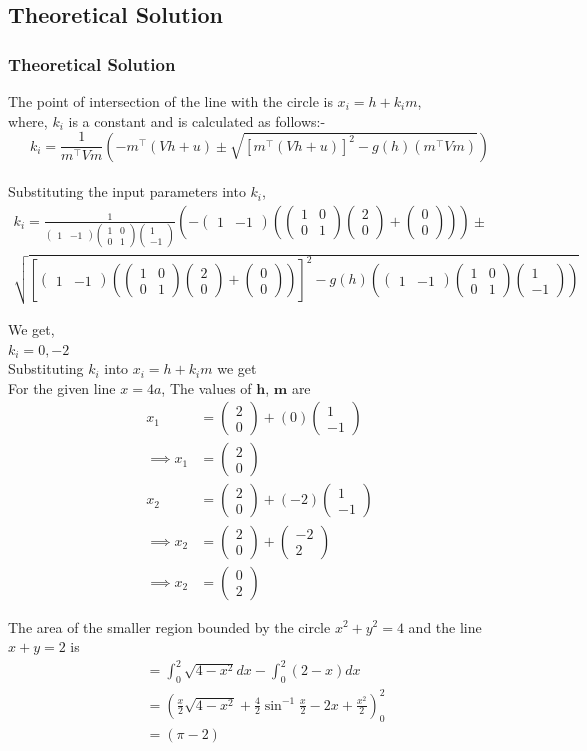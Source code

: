 \documentclass{beamer}
\providecommand{\sbrak}[1]{\ensuremath{{}\left[#1\right]}}
\providecommand{\brak}[1]{\ensuremath{\left(#1\right)}}
\theoremstyle{remark}
\newcommand{\myvec}[1]{\ensuremath{\begin{pmatrix}#1\end{pmatrix}}}
\let\vec\mathbf
\numberwithin{equation}{section}
\begin{document}
\subsection{Theoretical Solution}
\begin{frame}
\frametitle{Theoretical Solution}

The point of intersection of the line with the circle is $x_i=h+k_i m$,\\
where, $k_i$ is a constant and is calculated as follows:-
$$k_i=\frac{1}{m^\top Vm}\brak{-m^\top \brak{Vh+u}\pm \sqrt{\sbrak{m^\top \brak{Vh+u}}^ 2-g\brak{h}\brak{m^\top Vm}}}$$\\
Substituting the input parameters into $k_i$,\\
{\scriptsize
\begin{multline}
     k_i =\frac{1}{\myvec{1 
 & -1}\myvec{1 & 0 \\ 0 & 1}\myvec{1 \\ -1}}\brak{-\myvec{1&-1}\brak{\myvec{1&0\\0&1}\myvec{2\\0}+\myvec{0\\0}}}\pm \\
     \sqrt{\sbrak{\myvec{1&-1}\brak{\myvec{1&0\\0&1}\myvec{2\\0}+\myvec{0\\0}}}^2-g\brak{h}\brak{\myvec{1&-1}\myvec{1&0\\0&1}\myvec{1\\-1}}} 
\end{multline}
}
\end{frame}
\begin{frame}
We get,\\
$k_i= 0,-2$\\
Substituting $k_i$ into $x_i=h+k_i m$ we get\\
    For the given line $x=4a$, The values of $\vec{h}$, $\vec{m}$ are
\begin{align}
     x_1&=\myvec{2\\0}+\brak{0}\myvec{1\\-1}\\
    \implies x_1 &=\myvec{2\\0}\\
    x_2 &=\myvec{2\\0}+\brak{-2}\myvec{1\\-1}\\
    \implies x_2&=\myvec{2\\0}+\myvec{-2\\2}\\
    \implies x_2&=\myvec{0\\2}
\end{align}
\end{frame}
\begin{frame}
    The area of the smaller region bounded by the circle $x^2 + y^2 = 4$ and the line $x + y = 2$ is
\begin{align}
    &=\int_{0}^{2} \sqrt{4-x^2}dx-\int_{0}^{2} \brak{2-x} dx\\
    &=\brak{\frac{x}{2}\sqrt{4-x^2}+\frac{4}{2}\sin^{-1}{\frac{x}{2}}-2x+\frac{x^2}{2}}_{0}^{2}\\
    &=\brak{\pi-2}
\end{align}
\end{frame}
\end{document}
